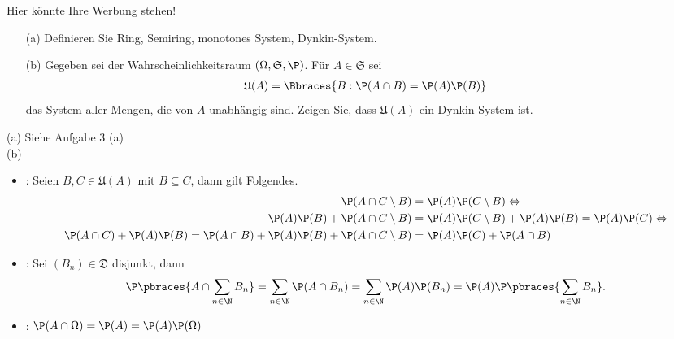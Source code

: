 \begin{exercise}

Hier könnte Ihre Werbung stehen!

\begin{itemize}
  \item[(a)] Definieren Sie Ring, Semiring, monotones System, Dynkin-System.
  \item[(b)] Gegeben sei der Wahrscheinlichkeitsraum $(\Omega, \mathfrak{S}, \P)$. Für $A \in \mathfrak{S}$ sei
  \begin{align*}
    \mathfrak{U}(A) = \Bbraces{B: \P(A \cap B) = \P(A) \P(B)}
  \end{align*}
  das System aller Mengen, die von $A$ unabhängig sind. Zeigen Sie, dass $\mathfrak{U}(A)$ ein Dynkin-System ist.
\end{itemize}

\end{exercise}


\begin{solution}

(a) Siehe Aufgabe 3 (a) \\

(b)

\begin{itemize}

  \item {}: Seien $B, C \in \mathfrak{U}(A)$ mit $B \subseteq C$, dann gilt Folgendes.
  \begin{align*}
    \P(A \cap C \setminus B)
    & = \P(A) \P(C \setminus B)
    \Leftrightarrow \\
    \P(A) \P(B) + \P(A \cap C \setminus B)
    & = \P(A) \P(C \setminus B) + \P(A) \P(B)
      = \P(A) \P(C)
    \Leftrightarrow \\
    \P(A \cap C) + \P(A) \P(B)
      =\P(A \cap B) + \P(A) \P(B) + \P(A \cap C \setminus B)
    & = \P(A) \P(C) + \P(A \cap B)
  \end{align*}

  \item {}: Sei $(B_n) \in \mathfrak{D}$ disjunkt, dann
  \begin{align*}
    \P \pbraces{A \cap \sum_{n \in \N} B_n}
    =
    \sum_{n \in \N} \P(A \cap B_n)
    =
    \sum_{n \in \N} \P(A) \P(B_n)
    =
    \P(A) \P \pbraces{\sum_{n \in \N} B_n}.
  \end{align*}

  \item {}: $\P(A \cap \Omega) = \P(A) = \P(A) \P(\Omega)$

\end{itemize}

\end{solution}
